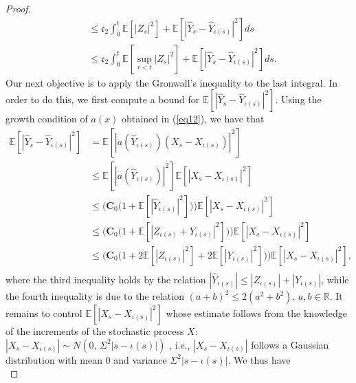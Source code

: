 \begin{proof}
\begin{align}
    &\leq \mathfrak{c}_2 \int^{t}_{0} \mathbb{E}[|Z_s|^2] + \mathbb{E}[|\hat{Y}_{s} - \hat{Y}_{\iota(s)}|^2] ds \nonumber \\
    &\leq \mathfrak{c}_2 \int^{t}_{0} \mathbb{E}[\sup_{r < t}|Z_s|^2] + \mathbb{E}[|\hat{Y}_{s}-\hat{Y}_{\iota(s)}|^2] ds.\nonumber
\end{align}
Our next objective is to apply the Gronwall's inequality to the last integral. In order to do this, we first compute a bound for $\mathbb{E}[|\hat{Y}_{s} - \hat{Y}_{\iota(s)}|^2]$. Using the growth condition of $a(x)$ obtained in (\ref{eq12}), we have that
\begin{equation}\label{eq15}
    \begin{aligned}
         \mathbb{E}[|\hat{Y}_{s} - \hat{Y}_{\iota(s)}|^2] &= \mathbb{E}[|a(\hat{Y}_{\iota(s)})(X_s - X_{\iota(s)})|^2]\\
         &\leq \mathbb{E}[|a(\hat{Y}_{\iota(s)})|^2]\mathbb{E}[|X_s - X_{\iota(s)}|^2]\\
         &\leq \bigg( \mathbf{C}_0 \big( 1 + \mathbb{E}[|\hat{Y}_{\iota(s)}|^2] \big) \bigg)\mathbb{E}[|X_s - X_{\iota(s)}|^2]\\
         &\leq \bigg( \mathbf{C}_0 \big( 1 + \mathbb{E}[|Z_{\iota(s)} + Y_{\iota(s)}|^2] \big) \bigg)\mathbb{E}[|X_s - X_{\iota(s)}|^2]\\
        &\leq \bigg( \mathbf{C}_0 \big( 1 + 2\mathbb{E}[|Z_{\iota(s)}|^2] + 2\mathbb{E}[|Y_{\iota(s)}|^2] \big) \bigg)\mathbb{E}[|X_s - X_{\iota(s)}|^2],\\
        \end{aligned}
    \end{equation}
where the third inequality holds by the relation $|\hat{Y}_{\iota(s)}| \leq |Z_{\iota(s)}| +|Y_{\iota(s)}| $, while the fourth inequality is due to the relation $(a + b)^2 \leq 2(a^2+b^2), \, a,b \in \mathbb{R} $.
It remains to control $\mathbb{E}[|X_s - X_{\iota(s)}|^2]$ whose estimate follows from the knowledge of the increments of the stochastic process $X$: $|X_s - X_{\iota(s)}| \sim N(0, \, \Sigma^2|s - \iota(s)|) $ , i.e., $|X_s - X_{\iota(s)}|$ follows a Gaussian distribution with mean 0 and variance $\Sigma^2|s - \iota(s)|$. We thus have
\begin{equation}\label{eq15b}

\end{equation}
\end{proof}
